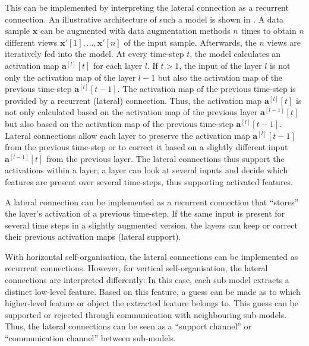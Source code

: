 This can be implemented by interpreting the lateral connection as a recurrent connection.
An illustrative architecture of such a model is shown in .
A data sample $\boldsymbol{x}$ can be augmented with data augmentation methods $n$ times to obtain $n$ different views $\boldsymbol{x}'[1], ..., \boldsymbol{x}'[n]$ of the input sample.
Afterwards, the $n$ views are iteratively fed into the model.
At every time-step $t$, the model calculates an activation map $\boldsymbol{a}^{[l]}[t]$ for each layer $l$.
If $t>1$, the input of the layer $l$ is not only the activation map of the layer $l-1$ but also the activation map of the previous time-step $\boldsymbol{a}^{[l]}[t-1]$.
The activation map of the previous time-step is provided by a recurrent (lateral) connection.
Thus, the activation map $\boldsymbol{a}^{[l]}[t]$ is not only calculated based on the activation map of the previous layer $\boldsymbol{a}^{[l-1]}[t]$ but also based on the activation map of the previous time-step $\boldsymbol{a}^{[l]}[t-1]$.
Lateral connections allow each layer to preserve the activation map $\boldsymbol{a}^{[l]}[t-1]$ from the previous time-step or to correct it based on a slightly different input $\boldsymbol{a}^{[l-1]}[t]$ from the previous layer. The lateral connections thus support the activations within a layer; a layer can look at several inputs and decide which features are present over several time-steps, thus supporting activated features.

\begin{implementation}
	A lateral connection can be implemented as a recurrent connection that ``stores'' the layer's activation of a previous time-step.
	If the same input is present for several time steps in a slightly augmented version, the layers can keep or correct their previous activation maps (lateral support).
\end{implementation}

With horizontal self-organisation, the lateral connections can be implemented as recurrent connections.
However, for vertical self-organisation, the lateral connections are interpreted differently:
In this case, each sub-model extracts a distinct low-level feature.
Based on this feature, a guess can be made as to which higher-level feature or object the extracted feature belongs to.
This guess can be supported or rejected through communication with neighbouring sub-models.
Thus, the lateral connections can be seen as a ``support channel'' or ``communication channel'' between sub-models. 

